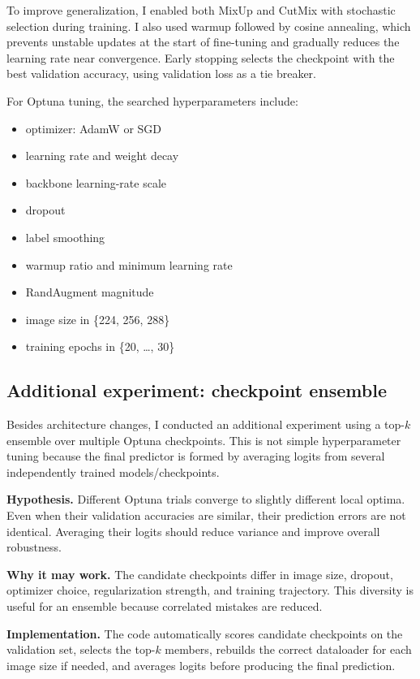 \documentclass[11pt]{article}
\begin{document}
To improve generalization, I enabled both MixUp and CutMix with stochastic selection during training. I also used warmup followed by cosine annealing, which prevents unstable updates at the start of fine-tuning and gradually reduces the learning rate near convergence. Early stopping selects the checkpoint with the best validation accuracy, using validation loss as a tie breaker.

For Optuna tuning, the searched hyperparameters include:
\begin{itemize}[leftmargin=1.5em]
\item optimizer: AdamW or SGD
\item learning rate and weight decay
\item backbone learning-rate scale
\item dropout
\item label smoothing
\item warmup ratio and minimum learning rate
\item RandAugment magnitude
\item image size in \{224, 256, 288\}
\item training epochs in \{20, \dots, 30\}
\end{itemize}

\subsection{Additional experiment: checkpoint ensemble}
Besides architecture changes, I conducted an additional experiment using a top-$k$ ensemble over multiple Optuna checkpoints. This is not simple hyperparameter tuning because the final predictor is formed by averaging logits from several independently trained models/checkpoints.

\textbf{Hypothesis.} Different Optuna trials converge to slightly different local optima. Even when their validation accuracies are similar, their prediction errors are not identical. Averaging their logits should reduce variance and improve overall robustness.

\textbf{Why it may work.} The candidate checkpoints differ in image size, dropout, optimizer choice, regularization strength, and training trajectory. This diversity is useful for an ensemble because correlated mistakes are reduced.

\textbf{Implementation.} The code automatically scores candidate checkpoints on the validation set, selects the top-$k$ members, rebuilds the correct dataloader for each image size if needed, and averages logits before producing the final prediction.
\end{document}
